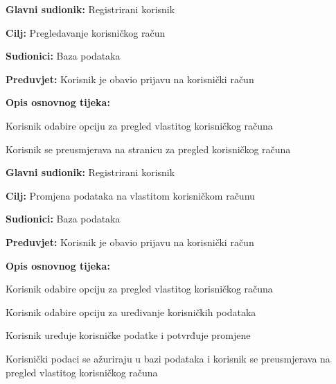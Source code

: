 \noindent {}
\begin{packed_item}

	\item \textbf{Glavni sudionik: }Registrirani korisnik
	\item  \textbf{Cilj:} Pregledavanje korisničkog račun
	\item  \textbf{Sudionici:} Baza podataka
	\item  \textbf{Preduvjet:} Korisnik je obavio prijavu na korisnički račun
	\item  \textbf{Opis osnovnog tijeka:}

	\item[] \begin{packed_enum}

		\item Korisnik odabire opciju za pregled vlastitog korisničkog računa
		\item Korisnik se preusmjerava na stranicu za pregled korisničkog računa
	\end{packed_enum}
\end{packed_item}


\noindent {}
\begin{packed_item}

	\item \textbf{Glavni sudionik: }Registrirani korisnik
	\item  \textbf{Cilj:} Promjena podataka na vlastitom korisničkom računu 
	\item  \textbf{Sudionici:} Baza podataka
	\item  \textbf{Preduvjet:} Korisnik je obavio prijavu na korisnički račun
	\item  \textbf{Opis osnovnog tijeka:}

	\item[] \begin{packed_enum}

		\item Korisnik odabire opciju za pregled vlastitog korisničkog računa
		\item Korisnik odabire opciju za uređivanje korisničkih podataka
		\item Korisnik uređuje korisničke podatke i potvrđuje promjene
		\item Korisnički podaci se ažuriraju u bazi podataka i korisnik se preusmjerava na pregled vlastitog korisničkog računa
	\end{packed_enum}

\end{packed_item}


